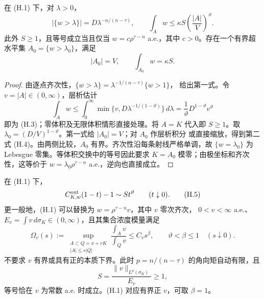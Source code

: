 \begin{lemma}[分布与重排常数]\label{lem:hom-distribution}
在 \textup{(H.1)} 下，对 $\lambda>0$，
\[
 |\{w>\lambda\}|=D\lambda^{-n/(n-\tau)},\qquad
 \int_Aw\le\kappa S\left(\frac{|A|}{V}\right)^\vartheta.\tag{H.3}
\]
此外 $S\ge1$，且等号成立当且仅当 $w=c\rho^{\tau-n}$ a.e.，其中 $c>0$。存在一个有界超水平集 $A_0=\{w>\lambda_0\}$，满足
\[
 |A_0|=V,\qquad \int_{A_0}w=\kappa S.\tag{H.4}
\]
\end{lemma}
\begin{proof}
由逐点齐次性，$\{w>\lambda\}=\lambda^{-1/(n-\tau)}\{w>1\}$，
给出第一式。令 $v=|A|\in(0,\infty)$，层析估计
\[\int_Aw\le\int_0^\infty\min\{v,D\lambda^{-1/(1-\vartheta)}\}\,d\lambda
=\frac1\vartheta D^{1-\vartheta}v^\vartheta\]
即为 (H.3)；零体积及无限体积情形直接处理。将 $A=K$ 代入即 $S\ge1$。取
$\lambda_0=(D/V)^{1-\vartheta}$。第一式给 $|A_0|=V$；对 $A_0$ 作层析积分
或直接缩放，得到第二式 (H.4)。由两侧比较，$A_0$ 有界。齐次性沿每条射线严格单调，故 $\{w=\lambda_0\}$ 为 Lebesgue 零集。等体积交换中的等号因此要求 $K=A_0$ 模零；由极坐标和齐次性，这等价于 $w=\lambda_0\rho^{\tau-n}$ a.e.，逆向也直接成立。
\end{proof}

\begin{theorem}[角向集中下的尖锐首项]\label{thm:hom-leading}
在 (H.1) 下，
\[
C^{\rm out}_{K,w}(1-t)-1\sim S t^\vartheta\qquad(t\downarrow0).\tag{H.5}
\]
更一般地，(H.1) 可以替换为 $w=\rho^{\tau-n}v$，其中 $v$ 零次齐次，
$0<v<\infty$ a.e.、$E_v=\int v\,d\sigma_K\in(0,\infty)$，且其集合浓度模量满足
\[
\Omega_v(s):=\sup_{\substack{A\subset Q=x+rK\\ |A|\le s|Q|}}
\frac{\int_Av}{\int_Qv}\le C_v s^\beta,
\qquad \vartheta<\beta\le1\quad(s\downarrow0). \tag{H.5a}
\]
不要求 $v$ 有界或具有正的本质下界。此时 $p=n/(n-\tau)$ 的角向矩自动有限，且
\[
S=\frac{\|v\|_{L^p(\sigma_K)}}{E_v}\ge1, \tag{H.5b}
\]
等号恰在 $v$ 为常数 a.e. 时成立。(H.1) 对应有界正 $v$，可取 $\beta=1$。
\end{theorem}

